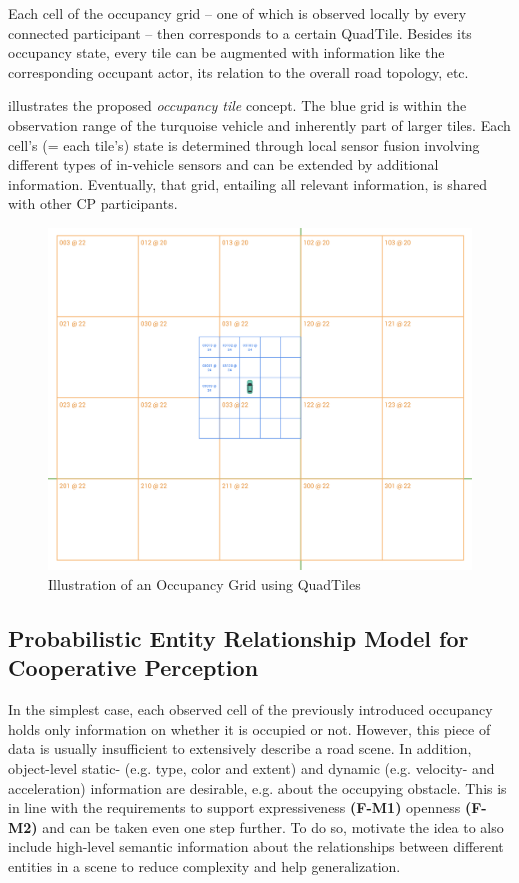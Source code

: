Each cell of the occupancy grid – one of which is observed locally by every connected participant – then corresponds to a certain QuadTile. Besides its occupancy state, every tile can be augmented with information like the corresponding occupant actor, its relation to the overall road topology, etc. 

 illustrates the proposed \textit{occupancy tile} concept. The blue grid is within the observation range of the turquoise vehicle and inherently part of larger tiles. Each cell's (= each tile's) state is determined through local sensor fusion involving different types of in-vehicle sensors and can be extended by additional information. Eventually, that grid, entailing all relevant information, is shared with other CP participants.

\begin{figure}[h]
	\centering
	\includegraphics[width=1.0\linewidth]{98_images/geo_subscription_schema_1}
	\caption{Illustration of an Occupancy Grid using QuadTiles}
	\label{fig:tiling1}
\end{figure}


\subsection{Probabilistic Entity Relationship Model for Cooperative Perception}
\label{subsec:concept_design:probabilistic_entity_relationship_model_for_cooperative_perception}

In the simplest case, each observed cell of the previously introduced occupancy holds only information on whether it is occupied or not. However, this  piece of data is usually insufficient to extensively describe a road scene. In addition, object-level static- (e.g. type, color and extent) and dynamic (e.g. velocity- and acceleration) information are desirable, e.g. about the occupying obstacle. This is in line with the requirements to support expressiveness \textbf{(F-M1)} openness \textbf{(F-M2)} and can be taken even one step further. To do so, \cite{Kohlhaas2014, Petrich2018} motivate the idea to also include high-level semantic information about the relationships between different entities in a scene to reduce complexity and help generalization. 

